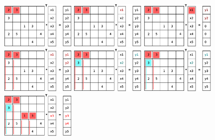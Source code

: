 \documentclass[a4paper,11pt]{scrartcl}
\begin{document}
\begin{figure}[ht]
\includegraphics[width=0.32\textwidth]{graphic/coloringT2.eps}\hfill\vline\hfill
\includegraphics[width=0.32\textwidth]{graphic/coloringT3.eps}\hfill\vline\hfill
\includegraphics[width=0.32\textwidth]{graphic/coloringT4.eps}
\includegraphics[width=0.32\textwidth]{graphic/coloringT5.eps}\hfill\vline\hfill
\includegraphics[width=0.32\textwidth]{graphic/coloringT6.eps}\hfill\vline\hfill
\includegraphics[width=0.32\textwidth]{graphic/coloringT7.eps}
\includegraphics[width=0.32\textwidth]{graphic/coloringT8.eps}\hfill\vline\hfill

\end{figure}
\end{document}
